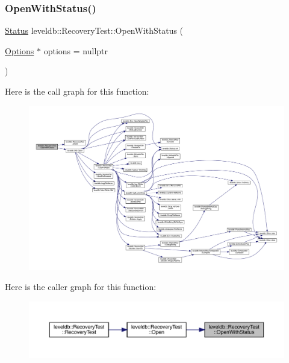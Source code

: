 \subsubsection{\texorpdfstring{OpenWithStatus()}{OpenWithStatus()}}
{\footnotesize\ttfamily \mbox{\hyperlink{classleveldb_1_1_status}{Status}} leveldb\+::\+Recovery\+Test\+::\+Open\+With\+Status (\begin{DoxyParamCaption}\item[{\mbox{\hyperlink{structleveldb_1_1_options}{Options}} $\ast$}]{options = {\ttfamily nullptr} }\end{DoxyParamCaption})\hspace{0.3cm}{\ttfamily [inline]}}

Here is the call graph for this function\+:
\nopagebreak
\begin{figure}[H]
\begin{center}
\leavevmode
\includegraphics[width=350pt]{classleveldb_1_1_recovery_test_a24c107441e4cd205302496825eb6cef7_cgraph}
\end{center}
\end{figure}
Here is the caller graph for this function\+:
\nopagebreak
\begin{figure}[H]
\begin{center}
\leavevmode
\includegraphics[width=350pt]{classleveldb_1_1_recovery_test_a24c107441e4cd205302496825eb6cef7_icgraph}
\end{center}
\end{figure}
\mbox{\label{classleveldb_1_1_recovery_test_ad5b3e5d410f452814a0c47b195bda9ff}} 
